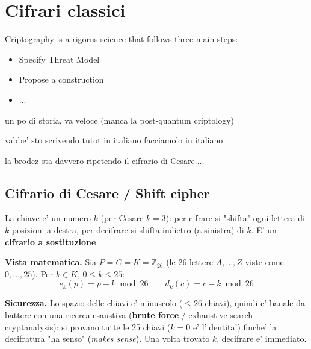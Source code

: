 \section{Cifrari classici}

Criptography is a rigorus science that follows three main steps:

\begin{itemize}
\item Specify Threat Model
\item Propose a construction
\item ...
\end{itemize}

un po di storia, va veloce (manca la post-quantum criptology)

vabbe' sto scrivendo tutot in italiano facciamolo in italiano

la brodez sta davvero ripetendo il cifrario di Cesare....

\subsection{Cifrario di Cesare / Shift cipher}
La chiave e' un numero $k$ (per Cesare $k=3$): per cifrare si "shifta" ogni lettera di $k$ posizioni a destra, per decifrare si shifta indietro (a sinistra) di $k$. E' un \textbf{cifrario a sostituzione}.

\textbf{Vista matematica.} Sia $P = C = K = \mathbb{Z}_{26}$ (le 26 lettere $A,\dots,Z$ viste come $0,\dots,25$). Per $k \in K$, $0 \le k \le 25$:
\[
  e_k(p) = p + k \bmod 26 \qquad d_k(c) = c - k \bmod 26
\]


\textbf{Sicurezza.} Lo spazio delle chiavi e' minuscolo ($\le 26$ chiavi), quindi e' banale da battere con una ricerca esaustiva (\textbf{brute force} / exhaustive-search cryptanalysis): si provano tutte le 25 chiavi ($k=0$ e' l'identita') finche' la decifratura "ha senso" (\textit{makes sense}). Una volta trovato $k$, decifrare e' immediato.

